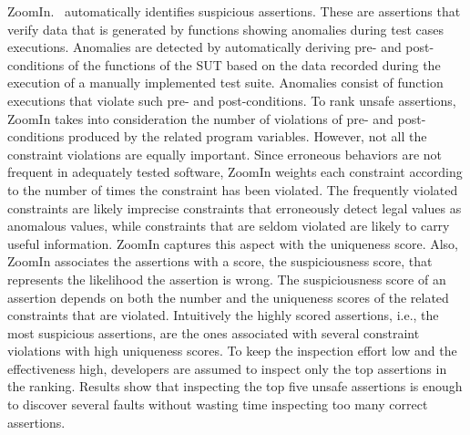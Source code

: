 ZoomIn.~\cite{PastoreICSE2015} automatically identifies suspicious assertions. These are assertions that verify data that is generated by functions showing anomalies during test cases executions. Anomalies are detected by automatically deriving pre- and post-conditions of the functions of the SUT based on the data recorded during the execution of a manually implemented test suite. Anomalies consist of function executions that violate such pre- and post-conditions. 
To rank unsafe assertions, ZoomIn takes into consideration the number of violations of pre- and post-conditions produced by the related program variables. However, not all the constraint violations are equally important. Since erroneous behaviors are not frequent in adequately tested software, ZoomIn weights each constraint according to the number of times the constraint has been violated. The frequently violated constraints are likely imprecise constraints that erroneously detect legal values as anomalous values, while constraints that are seldom violated are likely to carry useful information. ZoomIn captures this aspect with the uniqueness score. 
Also, ZoomIn associates the assertions with a score, the suspiciousness score, that represents the likelihood the assertion is wrong. The suspiciousness score of an assertion depends on both the number and the uniqueness scores of the related constraints that are violated. Intuitively the highly scored assertions, i.e., the most suspicious assertions, are the ones associated with several constraint violations with high uniqueness scores.
To keep the inspection effort low and the effectiveness high, developers are assumed to inspect only the top assertions in the ranking. Results show that inspecting the top five unsafe assertions is enough to discover several faults without wasting time inspecting too many correct assertions.



